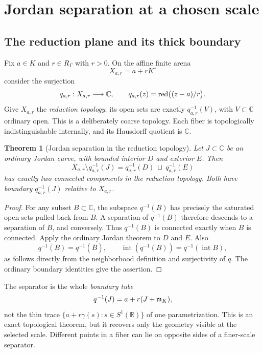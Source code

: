 \documentclass[11pt,letterpaper]{article}
\newtheorem{theorem}{Theorem}[section]
\theoremstyle{definition}
\theoremstyle{remark}
\newcommand{\C}{\mathbb C}\newcommand{\R}{\mathbb R}\newcommand{\Q}{\mathbb Q}\newcommand{\Z}{\mathbb Z}\newcommand{\N}{\mathbb N}
\numberwithin{equation}{section}
\begin{document}
\section{Jordan separation at a chosen scale}\label{sec:jordan-shadow}
\subsection{The reduction plane and its thick boundary}
Fix $a\in K$ and $r\in R_\Gamma$ with $r>0$. On the affine finite arena
\[
 X_{a,r}=a+rK^\circ
\]
consider the surjection
\begin{equation}\label{eq:shadow}
 q_{a,r}:X_{a,r}\longrightarrow\C,\qquad
 q_{a,r}(z)=\red\bigl((z-a)/r\bigr).
\end{equation}
Give $X_{a,r}$ the \emph{reduction topology}: its open sets are exactly $q_{a,r}^{-1}(V)$, with $V\subset\C$ ordinary open. This is a deliberately coarse topology. Each fiber is topologically indistinguishable internally, and its Hausdorff quotient is $\C$.

\begin{theorem}[Jordan separation in the reduction topology]\label{thm:shadow}
Let $J\subset\C$ be an ordinary Jordan curve, with bounded interior $D$ and exterior $E$. Then
\[
 X_{a,r}\setminus q_{a,r}^{-1}(J)
   =q_{a,r}^{-1}(D)\ \sqcup\ q_{a,r}^{-1}(E)
\]
has exactly two connected components in the reduction topology. Both have boundary $q_{a,r}^{-1}(J)$ relative to $X_{a,r}$.
\end{theorem}
\begin{proof}
For any subset $B\subset\C$, the subspace $q^{-1}(B)$ has precisely the saturated open sets pulled back from $B$. A separation of $q^{-1}(B)$ therefore descends to a separation of $B$, and conversely. Thus $q^{-1}(B)$ is connected exactly when $B$ is connected. Apply the ordinary Jordan theorem to $D$ and $E$. Also
\[
 \overline{q^{-1}(B)}=q^{-1}(\overline B),\qquad
 \operatorname{int}(q^{-1}(B))=q^{-1}(\operatorname{int}B),
\]
as follows directly from the neighborhood definition and surjectivity of $q$. The ordinary boundary identities give the assertion.
\end{proof}

The separator is the whole \emph{boundary tube}
\[
 q^{-1}(J)=a+r(J+\mathfrak m_K),
\]
not the thin trace $\{a+r\gamma(s):s\in S^1(\R)\}$ of one parametrization. This is an exact topological theorem, but it recovers only the geometry visible at the selected scale. Different points in a fiber can lie on opposite sides of a finer-scale separator.
\end{document}
